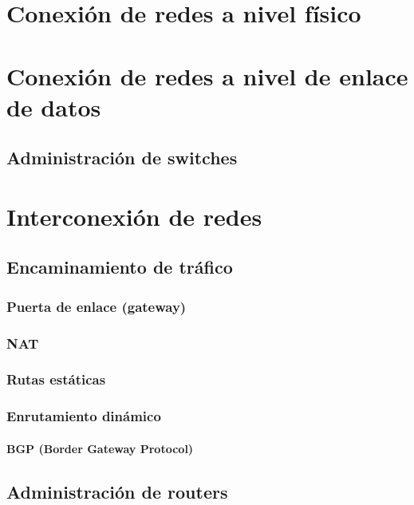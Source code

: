 \chapter{Conexión de redes a nivel físico}






\chapter{Conexión de redes a nivel de enlace de datos}


\section{Administración de switches}



\chapter{Interconexión de redes}

\section{Encaminamiento de tráfico}

\subsection{Puerta de enlace (gateway)}

\subsection{NAT}


\subsection{Rutas estáticas}


\subsection{Enrutamiento dinámico}

\subsubsection{BGP (Border Gateway Protocol)}



\section{Administración de routers}









